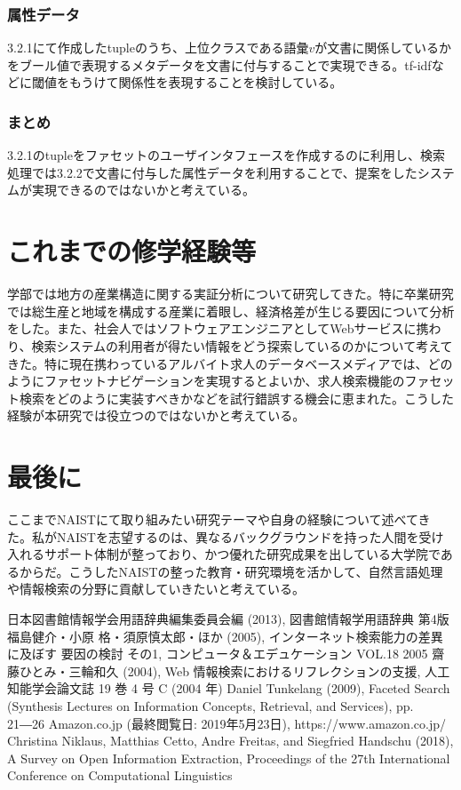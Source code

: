 \documentclass[a4j,10pt, twocolumn]{jarticle} \usepackage[dvipdfmx]{graphicx} \usepackage{amssymb} \usepackage{amsmath}
\begin{document}
\subsubsection{属性データ}
 3.2.1にて作成したtupleのうち、上位クラスである語彙$v$が文書に関係しているかをブール値で表現するメタデータを文書に付与することで実現できる。tf-idfなどに閾値をもうけて関係性を表現することを検討している。

\subsubsection{まとめ}
 3.2.1のtupleをファセットのユーザインタフェースを作成するのに利用し、検索処理では3.2.2で文書に付与した属性データを利用することで、提案をしたシステムが実現できるのではないかと考えている。

\section{これまでの修学経験等}
 学部では地方の産業構造に関する実証分析について研究してきた。特に卒業研究では総生産と地域を構成する産業に着眼し、経済格差が生じる要因について分析をした。また、社会人ではソフトウェアエンジニアとしてWebサービスに携わり、検索システムの利用者が得たい情報をどう探索しているのかについて考えてきた。特に現在携わっているアルバイト求人のデータベースメディアでは、どのようにファセットナビゲーションを実現するとよいか、求人検索機能のファセット検索をどのように実装すべきかなどを試行錯誤する機会に恵まれた。こうした経験が本研究では役立つのではないかと考えている。

\section{最後に}
ここまでNAISTにて取り組みたい研究テーマや自身の経験について述べてきた。私がNAISTを志望するのは、異なるバックグラウンドを持った人間を受け入れるサポート体制が整っており、かつ優れた研究成果を出している大学院であるからだ。こうしたNAISTの整った教育・研究環境を活かして、自然言語処理や情報検索の分野に貢献していきたいと考えている。

\begin{thebibliography}{9}
  日本図書館情報学会用語辞典編集委員会編 (2013), 図書館情報学用語辞典 第4版
   福島健介・小原 格・須原慎太郎・ほか (2005), インターネット検索能力の差異に及ぼす 要因の検討 その1, コンピュータ＆エデュケーション VOL.18 2005
   齋藤ひとみ・三輪和久 (2004),  Web 情報検索におけるリフレクションの支援, 人工知能学会論文誌 19 巻 4 号 C (2004 年)
  Daniel Tunkelang (2009), Faceted Search (Synthesis Lectures on Information Concepts, Retrieval, and Services), pp. 21―26
  Amazon.co.jp (最終閲覧日: 2019年5月23日), https://www.amazon.co.jp/
  Christina Niklaus, Matthias Cetto, Andre Freitas, and Siegfried Handschu (2018), A Survey on Open Information Extraction, Proceedings of the 27th International Conference on Computational Linguistics
\end{thebibliography}
\end{document}

